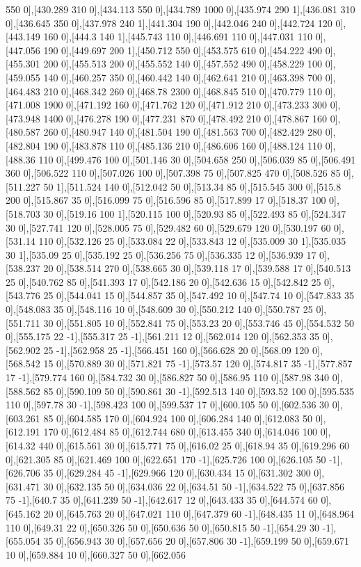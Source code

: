 {550 0],[430.289 310 0],[434.113 550 0],[434.789 1000 0],[435.974 290 1],[436.081 310 0],[436.645 350 0],[437.978 240 1],[441.304 190 0],[442.046 240 0],[442.724 120 0],[443.149 160 0],[444.3 140 1],[445.743 110 0],[446.691 110 0],[447.031 110 0],[447.056 190 0],[449.697 200 1],[450.712 550 0],[453.575 610 0],[454.222 490 0],[455.301 200 0],[455.513 200 0],[455.552 140 0],[457.552 490 0],[458.229 100 0],[459.055 140 0],[460.257 350 0],[460.442 140 0],[462.641 210 0],[463.398 700 0],[464.483 210 0],[468.342 260 0],[468.78 2300 0],[468.845 510 0],[470.779 110 0],[471.008 1900 0],[471.192 160 0],[471.762 120 0],[471.912 210 0],[473.233 300 0],[473.948 1400 0],[476.278 190 0],[477.231 870 0],[478.492 210 0],[478.867 160 0],[480.587 260 0],[480.947 140 0],[481.504 190 0],[481.563 700 0],[482.429 280 0],[482.804 190 0],[483.878 110 0],[485.136 210 0],[486.606 160 0],[488.124 110 0],[488.36 110 0],[499.476 100 0],[501.146 30 0],[504.658 250 0],[506.039 85 0],[506.491 360 0],[506.522 110 0],[507.026 100 0],[507.398 75 0],[507.825 470 0],[508.526 85 0],[511.227 50 1],[511.524 140 0],[512.042 50 0],[513.34 85 0],[515.545 300 0],[515.8 200 0],[515.867 35 0],[516.099 75 0],[516.596 85 0],[517.899 17 0],[518.37 100 0],[518.703 30 0],[519.16 100 1],[520.115 100 0],[520.93 85 0],[522.493 85 0],[524.347 30 0],[527.741 120 0],[528.005 75 0],[529.482 60 0],[529.679 120 0],[530.197 60 0],[531.14 110 0],[532.126 25 0],[533.084 22 0],[533.843 12 0],[535.009 30 1],[535.035 30 1],[535.09 25 0],[535.192 25 0],[536.256 75 0],[536.335 12 0],[536.939 17 0],[538.237 20 0],[538.514 270 0],[538.665 30 0],[539.118 17 0],[539.588 17 0],[540.513 25 0],[540.762 85 0],[541.393 17 0],[542.186 20 0],[542.636 15 0],[542.842 25 0],[543.776 25 0],[544.041 15 0],[544.857 35 0],[547.492 10 0],[547.74 10 0],[547.833 35 0],[548.083 35 0],[548.116 10 0],[548.609 30 0],[550.212 140 0],[550.787 25 0],[551.711 30 0],[551.805 10 0],[552.841 75 0],[553.23 20 0],[553.746 45 0],[554.532 50 0],[555.175 22 -1],[555.317 25 -1],[561.211 12 0],[562.014 120 0],[562.353 35 0],[562.902 25 -1],[562.958 25 -1],[566.451 160 0],[566.628 20 0],[568.09 120 0],[568.542 15 0],[570.889 30 0],[571.821 75 -1],[573.57 120 0],[574.817 35 -1],[577.857 17 -1],[579.774 160 0],[584.732 30 0],[586.827 50 0],[586.95 110 0],[587.98 340 0],[588.562 85 0],[590.109 50 0],[590.861 30 -1],[592.513 140 0],[593.52 100 0],[595.535 110 0],[597.78 30 -1],[598.423 100 0],[599.537 17 0],[600.105 50 0],[602.536 30 0],[603.261 85 0],[604.585 170 0],[604.924 100 0],[606.284 140 0],[612.083 50 0],[612.191 170 0],[612.484 85 0],[612.744 680 0],[613.455 340 0],[614.046 100 0],[614.32 440 0],[615.561 30 0],[615.771 75 0],[616.02 25 0],[618.94 35 0],[619.296 60 0],[621.305 85 0],[621.469 100 0],[622.651 170 -1],[625.726 100 0],[626.105 50 -1],[626.706 35 0],[629.284 45 -1],[629.966 120 0],[630.434 15 0],[631.302 300 0],[631.471 30 0],[632.135 50 0],[634.036 22 0],[634.51 50 -1],[634.522 75 0],[637.856 75 -1],[640.7 35 0],[641.239 50 -1],[642.617 12 0],[643.433 35 0],[644.574 60 0],[645.162 20 0],[645.763 20 0],[647.021 110 0],[647.379 60 -1],[648.435 11 0],[648.964 110 0],[649.31 22 0],[650.326 50 0],[650.636 50 0],[650.815 50 -1],[654.29 30 -1],[655.054 35 0],[656.943 30 0],[657.656 20 0],[657.806 30 -1],[659.199 50 0],[659.671 10 0],[659.884 10 0],[660.327 50 0],[662.056 }
